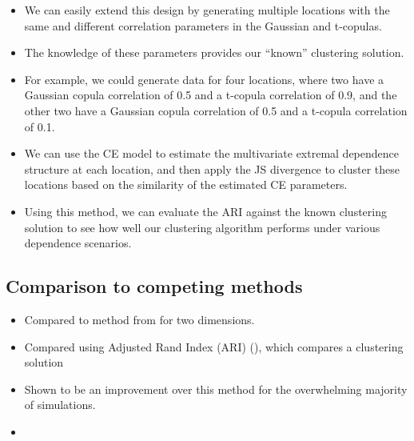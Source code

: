 \documentclass{article}
\numberwithin{equation}{section}
\begin{document}
\begin{itemize}
  \item We can easily extend this design by generating multiple locations with the same and different correlation parameters in the Gaussian and t-copulas.
  \item The knowledge of these parameters provides our ``known'' clustering solution.
  \item For example, we could generate data for four locations, where two have a Gaussian copula correlation of 0.5 and a t-copula correlation of 0.9, and the other two have a Gaussian copula correlation of 0.5 and a t-copula correlation of 0.1.  
  \item We can use the CE model to estimate the multivariate extremal dependence structure at each location, and then apply the JS divergence to cluster these locations based on the similarity of the estimated CE parameters. 
  \item Using this method, we can evaluate the ARI against the known clustering solution to see how well our clustering algorithm performs under various dependence scenarios.
\end{itemize}

\subsection{Comparison to competing methods} \label{subsec:sim_competing_methods}


\begin{itemize}
    \item Compared to method from \cite{Vignotto2021} for two dimensions. 
    \item Compared using Adjusted Rand Index (ARI) (), which compares a clustering solution
    \item Shown to be an improvement over this method for the overwhelming majority of simulations. 
    \item {}
\end{itemize}
\end{document}
